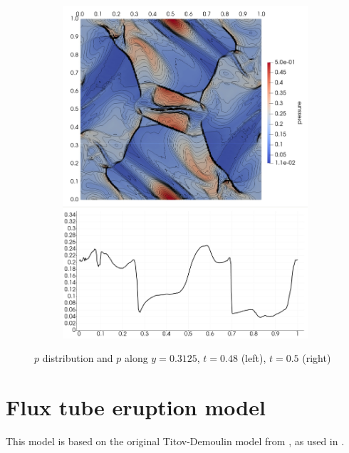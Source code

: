 \begin{figure}[H]
\begin{subfigure}[b]{0.425\textwidth}\includegraphics[width=\textwidth]{img/ot/my6.jpg}\end{subfigure}
\caption{$p$ distribution and $p$ along $y = 0.3125$, $t = 0.48$ (left), $t = 0.5$ (right)}
\label{figure:myOt3}
\end{figure}
\vspace{-3mm}

\section{Flux tube eruption model}
This model is based on the original Titov-Demoulin model from \cite{td}, as used in \cite{miraClanek}.

